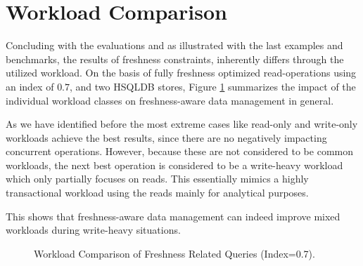 \section{Workload Comparison}

Concluding with the evaluations and as illustrated with the last examples and benchmarks, the results of freshness constraints, 
inherently differs through the utilized workload.
On the basis of fully freshness optimized read-operations using an index of $0.7$, and two HSQLDB stores,
Figure \ref{fig:workload_comp} summarizes the impact of the individual workload classes on freshness-aware data management in general. 


As we have identified before the most extreme cases like read-only and write-only workloads achieve the best results,
since there are no negatively  impacting concurrent operations.
However, because these are not considered to be common workloads, the next best operation is considered to be a write-heavy workload 
which only partially focuses on reads.
This essentially mimics a highly transactional workload using the reads mainly for analytical purposes.


This shows that freshness-aware data management can indeed improve mixed workloads during write-heavy situations.

\begin{figure}[t] 
    \centering 
    \caption{Workload Comparison of Freshness Related Queries (Index=0.7).}
    \label{fig:workload_comp}
\end{figure}


